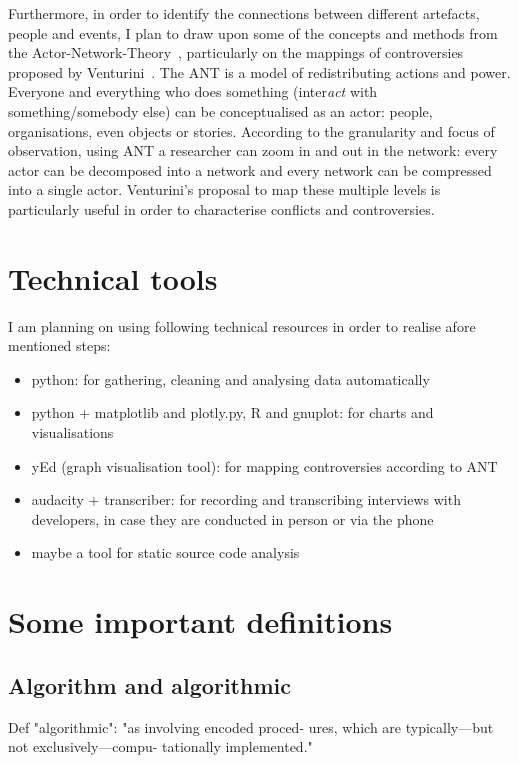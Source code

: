 \documentclass[pdftex,a4paper,11pt]{scrartcl}
\begin{document}
Furthermore, in order to identify the connections between different artefacts, people and events, I plan to draw upon some of the concepts and methods from the Actor-Network-Theory~\cite{Latour2010}, particularly on the mappings of controversies proposed by Venturini~\cite{Venturini2010a}.
The ANT is a model of redistributing actions and power.
Everyone and everything who does something (inter\emph{act} with something/somebody else) can be conceptualised as an actor: people, organisations, even objects or stories.
According to the granularity and focus of observation, using ANT a researcher can zoom in and out in the network: every actor can be decomposed into a network and every network can be compressed into a single actor.
Venturini's proposal to map these multiple levels is particularly useful in order to characterise conflicts and controversies.


\section{Technical tools}

I am planning on using following technical resources in order to realise afore mentioned steps:

\begin{itemize}
    \item python: for gathering, cleaning and analysing data automatically
    \item python + matplotlib and plotly.py, R and gnuplot: for charts and visualisations
    \item yEd (graph visualisation tool): for mapping controversies according to ANT
    \item audacity + transcriber: for recording and transcribing interviews with developers, in case they are conducted in person or via the phone
    \item maybe a tool for static source code analysis
\end{itemize}

\section{Some important definitions}

\subsection{Algorithm and algorithmic}
Def "algorithmic": "as involving encoded proced-
ures, which are typically—but not exclusively—compu-
tationally implemented."~\cite{Geiger2017}
\end{document}

